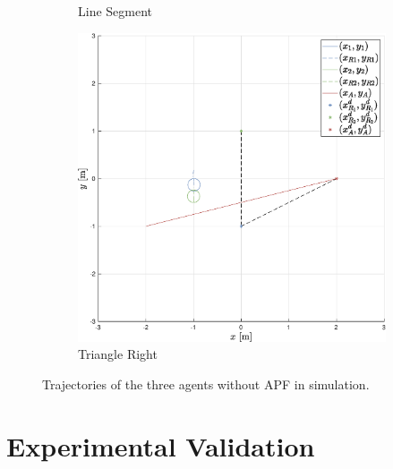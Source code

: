 \documentclass{ifacconf}
\begin{document}
\begin{figure}
\begin{subfigure}[b]{0.32\columnwidth}
        \caption{Line Segment}
    \end{subfigure}
    \begin{subfigure}[b]{0.32\columnwidth}
        \centering
        \includegraphics[width=\linewidth]{images/simulations/wo_APF/3rd_scenario_wo.eps}
        \caption{Triangle Right}
    \end{subfigure}
    \vspace{-0.2cm}
    \caption{Trajectories of the three agents without APF in simulation.}
\end{figure}


\section{Experimental Validation}
\label{sec:experimental_validation}
\end{document}
